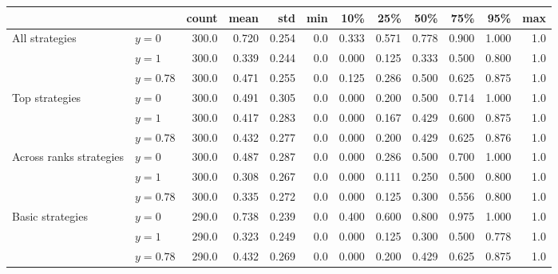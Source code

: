 \begin{tabular}{llrrrrrrrrrr}
\toprule
                 &          &  count &   mean &    std &  min &    10\% &    25\% &    50\% &    75\% &    95\% &  max \\
\midrule
All strategies & $y=0$ &  300.0 &  0.720 &  0.254 &  0.0 &  0.333 &  0.571 &  0.778 &  0.900 &  1.000 &  1.0 \\
                 & $y=1$ &  300.0 &  0.339 &  0.244 &  0.0 &  0.000 &  0.125 &  0.333 &  0.500 &  0.800 &  1.0 \\
                 & $y=0.78$ &  300.0 &  0.471 &  0.255 &  0.0 &  0.125 &  0.286 &  0.500 &  0.625 &  0.875 &  1.0 \\
Top strategies & $y=0$ &  300.0 &  0.491 &  0.305 &  0.0 &  0.000 &  0.200 &  0.500 &  0.714 &  1.000 &  1.0 \\
                 & $y=1$ &  300.0 &  0.417 &  0.283 &  0.0 &  0.000 &  0.167 &  0.429 &  0.600 &  0.875 &  1.0 \\
                 & $y=0.78$ &  300.0 &  0.432 &  0.277 &  0.0 &  0.000 &  0.200 &  0.429 &  0.625 &  0.876 &  1.0 \\
Across ranks strategies & $y=0$ &  300.0 &  0.487 &  0.287 &  0.0 &  0.000 &  0.286 &  0.500 &  0.700 &  1.000 &  1.0 \\
                 & $y=1$ &  300.0 &  0.308 &  0.267 &  0.0 &  0.000 &  0.111 &  0.250 &  0.500 &  0.800 &  1.0 \\
                 & $y=0.78$ &  300.0 &  0.335 &  0.272 &  0.0 &  0.000 &  0.125 &  0.300 &  0.556 &  0.800 &  1.0 \\
Basic strategies & $y=0$ &  290.0 &  0.738 &  0.239 &  0.0 &  0.400 &  0.600 &  0.800 &  0.975 &  1.000 &  1.0 \\
                 & $y=1$ &  290.0 &  0.323 &  0.249 &  0.0 &  0.000 &  0.125 &  0.300 &  0.500 &  0.778 &  1.0 \\
                 & $y=0.78$ &  290.0 &  0.432 &  0.269 &  0.0 &  0.000 &  0.200 &  0.429 &  0.625 &  0.875 &  1.0 \\
\bottomrule
\end{tabular}
